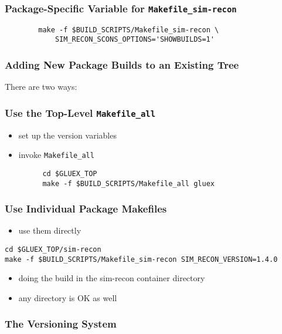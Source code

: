 \documentclass{beamer}
\newcommand{\bi}{\begin{itemize}}
\newcommand{\ei}{\end{itemize}}
\newcommand{\I}{\item}
\begin{document}
\begin{frame}[fragile]
  \frametitle{Package-Specific Variable for {\tt Makefile\_sim-recon}}

\begin{verbatim}
        make -f $BUILD_SCRIPTS/Makefile_sim-recon \
            SIM_RECON_SCONS_OPTIONS='SHOWBUILDS=1'
\end{verbatim}

\end{frame}
\begin{frame}\frametitle{Adding New Package Builds to an Existing Tree}\label{section:adding-packages}

There are two ways:

\end{frame}
\begin{frame}[fragile]\frametitle{Use the Top-Level {\tt Makefile\_all}}
\bi
\I set up the version variables
\I invoke {\tt Makefile\_all}
\ei
\begin{verbatim}
         cd $GLUEX_TOP
         make -f $BUILD_SCRIPTS/Makefile_all gluex
\end{verbatim}

\end{frame}
\begin{frame}[fragile]\frametitle{Use Individual Package Makefiles}
\bi
\I use them directly
\ei
\begin{verbatim}
cd $GLUEX_TOP/sim-recon
make -f $BUILD_SCRIPTS/Makefile_sim-recon SIM_RECON_VERSION=1.4.0
\end{verbatim}
\bi
\I doing the build in the sim-recon container directory
\I any directory is OK as well
\ei
\end{frame}
\begin{frame}\frametitle{The Versioning System}\label{section:versioning}

\end{frame}
\end{document}
